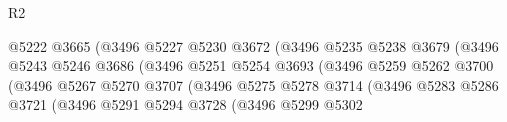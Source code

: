 \begin{lexlean}{R2}
\begin{coremodule}
                                                @5222
                                                @3665
                                                (@3496
                                                  @5227
                                                  @5230
                                                  @3672
                                                  (@3496
                                                    @5235
                                                    @5238
                                                    @3679
                                                    (@3496
                                                      @5243
                                                      @5246
                                                      @3686
                                                      (@3496
                                                        @5251
                                                        @5254
                                                        @3693
                                                        (@3496
                                                          @5259
                                                          @5262
                                                          @3700
                                                          (@3496
                                                            @5267
                                                            @5270
                                                            @3707
                                                            (@3496
                                                              @5275
                                                              @5278
                                                              @3714
                                                              (@3496
                                                                @5283
                                                                @5286
                                                                @3721
                                                                (@3496
                                                                  @5291
                                                                  @5294
                                                                  @3728
                                                                  (@3496
                                                                    @5299
                                                                    @5302

\end{coremodule}
\end{lexlean}
